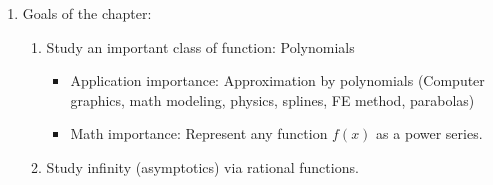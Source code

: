 \documentclass{article}
\begin{document}
\begin{enumerate}
\item Goals of the chapter:
\begin{enumerate}
\item Study an important class of function: Polynomials
\begin{itemize}
\item Application importance: Approximation by polynomials (Computer graphics, math modeling, physics, splines, FE method, parabolas)
\item Math importance: Represent any function $f(x)$ as a power series.
\end{itemize}
\item Study infinity (asymptotics) via rational functions.
\end{enumerate}
\end{enumerate}

\end{document}
